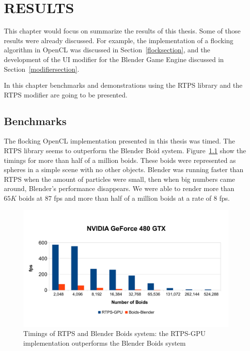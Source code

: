 \chapter{RESULTS}\label{resultsChapter}

This chapter would focus on summarize the results of this thesis. Some of those results were already discussed. For example, the implementation of a flocking algorithm in OpenCL was discussed in Section~\ref{flocksection}, and the development of the UI modifier for the Blender Game Engine discussed in Section~\ref{modifiersection}. 

In this chapter benchmarks and demonstrations using the RTPS library and the RTPS modifier are going to be presented.

\section{Benchmarks}

The flocking OpenCL implementation presented in this thesis was timed. The RTPS library seems to outperform the Blender Boid system. Figure~\ref{plot} show the timings for more than half of a million boids. These boids were represented as spheres in a simple scene with no other objects. Blender was running faster than RTPS when the amount of particles were small, then when big numbers came around, Blender's performance disappears.  We were able to render more than $65K$ boids at $87$ fps and more than half of a million boids at a rate of $8$ fps.

\begin{figure}[htbp]
\begin{center}
\includegraphics[scale=0.55]{figures/benchmarks.pdf}
\caption{Timings of RTPS and Blender Boids system: the RTPS-GPU implementation outperforms the Blender Boids system}
\label{plot}
\end{center}
\end{figure}

